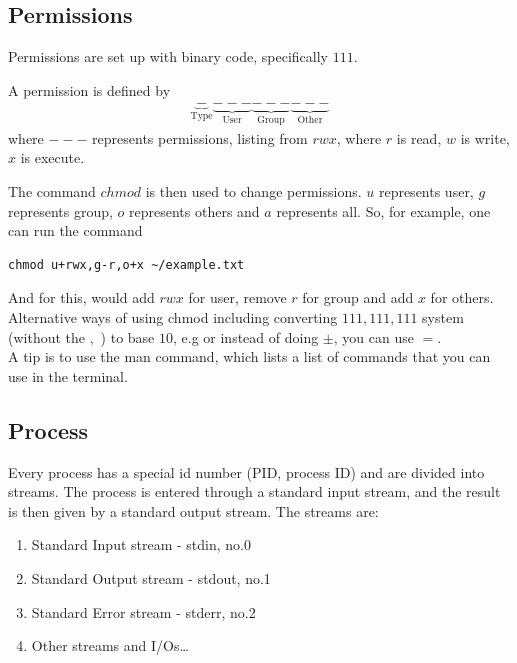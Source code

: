 \documentclass[a4paper]{article}
\theoremstyle{plain}
\theoremstyle{definition}
\newtheorem{defn}{Definition}[section]
\theoremstyle{remark}
\begin{document}
\subsection{Permissions}
Permissions are set up with binary code, specifically $111$.
\begin{tcolorbox}[colback=black!3!white,colframe=black!60!white,title=\begin{defn}Permissions \label{Permissions}\end{defn}]
A permission is defined by
\begin{align}
	\underbrace{-}_{\text{Type}}\underbrace{---}_{\text{User}}\underbrace{---}_{\text{Group}}\underbrace{---}_{\text{Other}}
\end{align}
where $---$ represents permissions, listing from $rwx$, where $r$ is read, $w$ is write, $x$ is execute. 
\end{tcolorbox}
The command $chmod$ is then used to change permissions. $u$ represents user, $g$ represents group, $o$ represents others and $a$ represents all. So, for example, one can run the command
\begin{lstlisting}[language = Shell]
chmod u+rwx,g-r,o+x ~/example.txt
\end{lstlisting}
And for this, would add $rwx$ for user, remove $r$ for group and add $x$ for others. Alternative ways of using chmod including converting $111,111,111$ system (without the $,$ ) to base $10$, e.g or instead of doing $\pm$, you can use $=$.\\
A tip is to use the man command, which lists a list of commands that you can use in the terminal.
\subsection{Process}
Every process has a special id number (PID, process ID) and are divided into streams. The process is entered through a standard input stream, and the result is then given by a standard output stream. The streams are:
\begin{enumerate}
	\item Standard Input stream - stdin, no.0\\
	\item Standard Output stream - stdout, no.1 \\
	\item Standard Error stream - stderr, no.2 \\
	\item Other streams and I/Os\ldots
\end{enumerate}
\end{document}
